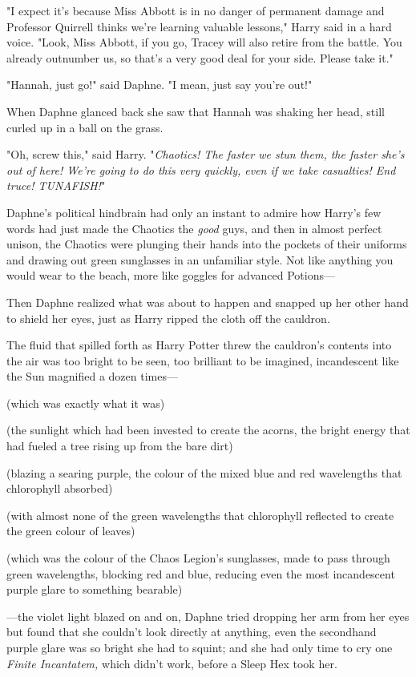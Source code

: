 "I expect it's because Miss Abbott is in no danger of permanent damage and
Professor Quirrell thinks we're learning valuable lessons," Harry said in a
hard voice. "Look, Miss Abbott, if you go, Tracey will also retire from the
battle. You already outnumber us, so that's a very good deal for your side.
Please take it."

"Hannah, just go!" said Daphne. "I mean, just say you're out!"

When Daphne glanced back she saw that Hannah was shaking her head, still curled
up in a ball on the grass.

"Oh, screw this," said Harry. "\emph{Chaotics! The faster we stun them, the
faster she's out of here! We're going to do this very quickly, even if we take
casualties! End truce! TUNAFISH!}"

Daphne's political hindbrain had only an instant to admire how Harry's few
words had just made the Chaotics the \emph{good} guys, and then in almost
perfect unison, the Chaotics were plunging their hands into the pockets of
their uniforms and drawing out green sunglasses in an unfamiliar style. Not
like anything you would wear to the beach, more like goggles for advanced
Potions---

Then Daphne realized what was about to happen and snapped up her other hand to
shield her eyes, just as Harry ripped the cloth off the cauldron.

The fluid that spilled forth as Harry Potter threw the cauldron's contents into
the air was too bright to be seen, too brilliant to be imagined, incandescent
like the Sun magnified a dozen times---

(which was exactly what it was)

(the sunlight which had been invested to create the acorns, the bright energy
that had fueled a tree rising up from the bare dirt)

(blazing a searing purple, the colour of the mixed blue and red wavelengths that
chlorophyll absorbed)

(with almost none of the green wavelengths that chlorophyll reflected to create
the green colour of leaves)

(which was the colour of the Chaos Legion's sunglasses, made to pass through
green wavelengths, blocking red and blue, reducing even the most incandescent
purple glare to something bearable)

---the violet light blazed on and on, Daphne tried dropping her arm from her
eyes but found that she couldn't look directly at anything, even the secondhand
purple glare was so bright she had to squint; and she had only time to cry one
\emph{Finite Incantatem,} which didn't work, before a Sleep Hex took her.


